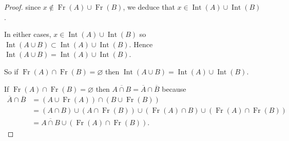 \begin{proof}
	since \( x \notin \operatorname{Fr}(A) \cup \operatorname{Fr}(B) \), we deduce that \( x \in \operatorname{Int}(A) \cup \operatorname{Int}(B) \).

	In either cases, \( x \in \operatorname{Int}(A) \cup \operatorname{Int}(B) \) so \( \operatorname{Int}(A \cup B) \subset \operatorname{Int}(A) \cup \operatorname{Int}(B) \). Hence \( \operatorname{Int}(A \cup B) = \operatorname{Int}(A) \cup \operatorname{Int}(B) \).

	So if \( \operatorname{Fr}(A) \cap \operatorname{Fr}(B) = \varnothing \) then \( \operatorname{Int}(A \cup B) = \operatorname{Int}(A) \cup \operatorname{Int}(B) \).

	\hrulefill%

	If \( \operatorname{Fr}(A) \cap \operatorname{Fr}(B) = \varnothing \) then \( \overline{A \cap B} = \overline{A} \cap \overline{B} \) because
	\begingroup
	\allowdisplaybreaks%
	\begin{align*}
		\overline{A} \cap \overline{B} & = \left( A \cup \operatorname{Fr}(A) \right) \cap \left( B \cup \operatorname{Fr}(B) \right)                                                          \\
		                               & = (A \cap B) \cup (A \cap \operatorname{Fr}(B)) \cup (\operatorname{Fr}(A) \cap B) \cup \left( \operatorname{Fr}(A) \cap \operatorname{Fr}(B) \right) \\
		                               & = \overline{A \cap B} \cup \left( \operatorname{Fr}(A) \cap \operatorname{Fr}(B) \right).
	\end{align*}
	\endgroup


\end{proof}
